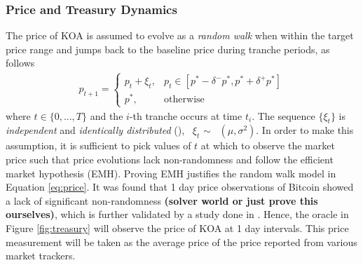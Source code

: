 \subsubsection{Price and Treasury Dynamics}
The price of KOA is assumed to evolve as a \textit{random walk} when within the target price range and jumps back to the baseline price during tranche periods, as follows
%
\begin{equation} \label{eq:price}
\begin{aligned}
p_{t+1} =
\begin{cases}
      p_t + \xi_t, & p_t \in [p^* - \delta^- p^*, p^* + \delta^+ p^*] \\
      p^*, & \text{otherwise}
\end{cases}
\end{aligned}
\end{equation}
%
where $t \in \{0,...,T\}$ and the $i$-th tranche occurs at time $t_i$. The sequence $\{\xi_t\}$ is \textit{independent} and \textit{identically distributed} (\iid), \ie\ $\xi_t$ $\sim$ \iid\ $(\mu, \sigma^2)$. In order to make this assumption, it is sufficient to pick values of $t$ at which to observe the market price such that price evolutions lack non-randomness and follow the efficient market hypothesis (EMH). Proving EMH justifies the random walk model in Equation \ref{eq:price}. It was found that 1 day price observations of Bitcoin showed a lack of significant non-randomness \textbf{(solver world or just prove this ourselves)}, which is further validated by a study done in \cite{Bartos15}. Hence, the oracle in Figure \ref{fig:treasury} will observe the price of KOA at 1 day intervals. This price measurement will be taken as the average price of the price reported from various market trackers.

